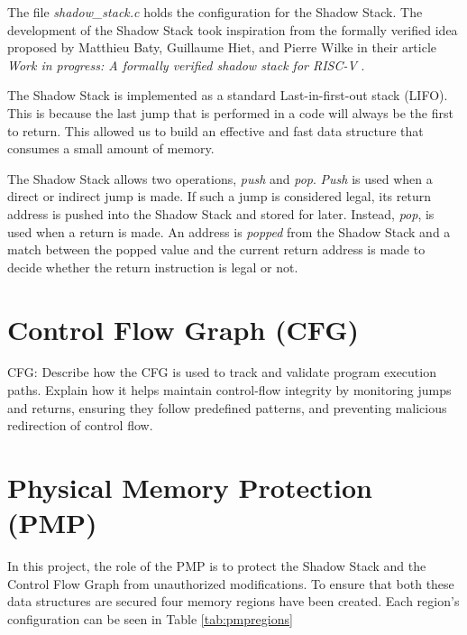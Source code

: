 The file \textit{shadow\_stack.c} holds the configuration for the Shadow Stack.
The development of the Shadow Stack took inspiration from the formally verified
idea proposed by Matthieu Baty, Guillaume Hiet, and Pierre Wilke in their
article \textit{Work in progress: A formally verified shadow stack for RISC-V} \cite{shadowstack}.

The Shadow Stack is implemented as a standard Last-in-first-out stack (LIFO).
This is because the last jump that is performed in a code will always be the
first to return. This allowed us to build an effective and fast data structure that
consumes a small amount of memory.

The Shadow Stack allows two operations, \textit{push} and \textit{pop}. \textit{Push}
is used when a direct or indirect jump is made. If such a jump is considered legal,
its return address is pushed into the Shadow Stack and stored for later. Instead,
\textit{pop}, is used when a return is made. An address is \textit{popped} from
the Shadow Stack and a match between the popped value and the current return
address is made to decide whether the return instruction is legal or not.

\section{Control Flow Graph (CFG)}
\label{sec:project_cfg}

CFG: Describe how the CFG is used to track and validate program execution paths.
Explain how it helps maintain control-flow integrity by monitoring jumps and returns,
ensuring they follow predefined patterns, and preventing malicious redirection of
control flow.

\section{Physical Memory Protection (PMP)}
\label{sec:project_pmp}

In this project, the role of the PMP is to protect the Shadow Stack and the Control
Flow Graph from unauthorized modifications. To ensure that both these data
structures are secured four memory regions have been created. Each region's configuration
can be seen in Table \ref{tab:pmpregions}

